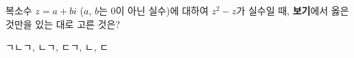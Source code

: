 복소수 $z=a+bi$ ($a$, $b$는 $0$이 아닌 실수)에 대하여 $z^2-z$가 실수일 때, \textbf{보기}에서 옳은 것만을 있는 대로 고른 것은?  
\begin{choices32}{ㄱ}{ㄴ}{ㄱ, ㄴ}{ㄱ, ㄷ}{ㄱ, ㄴ, ㄷ}\end{choices32}
